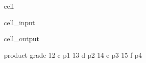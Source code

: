 \documentclass[letterpaper,10pt,english]{jupyterBook}
\begin{document}
\begin{sphinxuseclass}{cell}\begin{sphinxVerbatimInput}

\begin{sphinxuseclass}{cell_input}
\begin{sphinxVerbatim}[commandchars=\\\{\}]
   
\end{sphinxVerbatim}

\end{sphinxuseclass}\end{sphinxVerbatimInput}
\begin{sphinxVerbatimOutput}

\begin{sphinxuseclass}{cell_output}
\begin{sphinxVerbatim}[commandchars=\\\{\}]
   product grade
12       c    p1
13       d    p2
14       e    p3
15       f    p4
\end{sphinxVerbatim}

\end{sphinxuseclass}\end{sphinxVerbatimOutput}

\end{sphinxuseclass}
\end{document}
